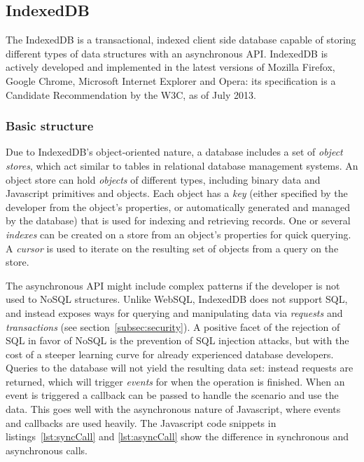 \subsection{IndexedDB}
\label{sec:indexeddb}
The IndexedDB is a transactional, indexed client side database capable of storing different types of data structures with an asynchronous API. IndexedDB is actively developed and implemented in the latest versions of Mozilla Firefox, Google Chrome, Microsoft Internet Explorer and Opera: its specification is a Candidate Recommendation by the W3C, as of July 2013\cite{IndexedDB:Online}.

\subsubsection{Basic structure}
Due to IndexedDB's object-oriented nature, a database includes a set of \emph{object stores}, which act similar to tables in relational database management systems. An object store can hold \emph{objects} of different types, including binary data and Javascript primitives and objects. Each object has a \emph{key} (either specified by the developer from the object's properties, or automatically generated and managed by the database) that is used for indexing and retrieving records. One or several \emph{indexes} can be created on a store from an object's properties for quick querying. A \emph{cursor} is used to iterate on the resulting set of objects from a query on the store.

The asynchronous API might include complex patterns if the developer is not used to NoSQL structures. Unlike WebSQL, IndexedDB does not support SQL, and instead exposes ways for querying and manipulating data via \emph{requests} and \emph{transactions} (see section~\ref{subsec:security}). A positive facet of the rejection of SQL in favor of NoSQL is the prevention of SQL injection attacks, but with the cost of a steeper learning curve for already experienced database developers. Queries to the database will not yield the resulting data set: instead requests are returned, which will trigger \emph{events} for when the operation is finished. When an event is triggered a callback can be passed to handle the scenario and use the data. This goes well with the asynchronous nature of Javascript, where events and callbacks are used heavily. The Javascript code snippets in listings~\ref{lst:syncCall} and \ref{lst:asyncCall} show the difference in synchronous and asynchronous calls.

